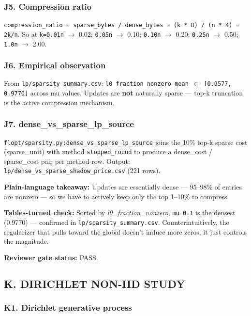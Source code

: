 \documentclass{article}
\begin{document}
\subsubsection{J5. Compression ratio}


\texttt{compression\_ratio = sparse\_bytes / dense\_bytes = (k * 8) / (n * 4) = 2k/n}. So at \texttt{k=0.01n} \ensuremath{\rightarrow} 0.02; \texttt{0.05n} \ensuremath{\rightarrow} 0.10; \texttt{0.10n} \ensuremath{\rightarrow} 0.20; \texttt{0.25n} \ensuremath{\rightarrow} 0.50; \texttt{1.0n} \ensuremath{\rightarrow} 2.00.


\subsubsection{J6. Empirical observation}


From \texttt{lp/sparsity\_summary.csv}: \texttt{l0\_fraction\_nonzero\_mean \ensuremath{\in} [0.9577, 0.9770]} across mu values. Updates are \textbf{not} naturally sparse --- top-k truncation is the active compression mechanism.


\subsubsection{J7. dense\_vs\_sparse\_lp\_source}


\texttt{flopt/sparsity.py:dense\_vs\_sparse\_lp\_source} joins the 10\% top-k sparse cost (sparse\_unit) with method \texttt{stopped\_round} to produce a dense\_cost / sparse\_cost pair per method-row. Output: \texttt{lp/dense\_vs\_sparse\_shadow\_price.csv} (221 rows).


\textbf{Plain-language takeaway:} Updates are essentially dense --- 95--98\% of entries are nonzero --- so we have to actively keep only the top 1--10\% to compress.


\textbf{Tables-turned check:} Sorted by \emph{l0\_fraction\_nonzero}, \texttt{mu=0.1} is the densest (0.9770) --- confirmed in \texttt{lp/sparsity\_summary.csv}. Counterintuitively, the regularizer that pulls toward the global doesn't induce more zeros; it just controls the magnitude.


\textbf{Reviewer gate status:} PASS.


\subsection{K. DIRICHLET NON-IID STUDY}


\subsubsection{K1. Dirichlet generative process}
\end{document}

